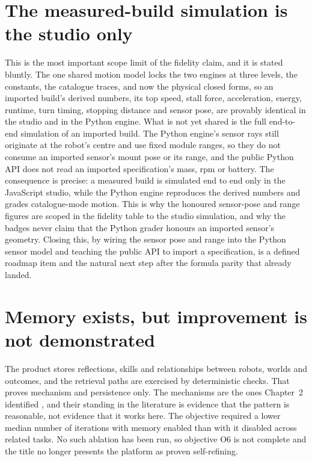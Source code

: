 \documentclass[11pt,a4paper]{report}
\begin{document}
\section{The measured-build simulation is the studio only}
This is the most important scope limit of the fidelity claim, and it is stated bluntly. The one shared motion model locks the two engines at three levels, the constants, the catalogue traces, and now the physical closed forms, so an imported build's derived numbers, its top speed, stall force, acceleration, energy, runtime, turn timing, stopping distance and sensor pose, are provably identical in the studio and in the Python engine. What is not yet shared is the full end-to-end simulation of an imported build. The Python engine's sensor rays still originate at the robot's centre and use fixed module ranges, so they do not consume an imported sensor's mount pose or its range, and the public Python API does not read an imported specification's mass, rpm or battery. The consequence is precise: a measured build is simulated end to end only in the JavaScript studio, while the Python engine reproduces the derived numbers and grades catalogue-mode motion. This is why the honoured sensor-pose and range figures are scoped in the fidelity table to the studio simulation, and why the badges never claim that the Python grader honours an imported sensor's geometry. Closing this, by wiring the sensor pose and range into the Python sensor model and teaching the public API to import a specification, is a defined roadmap item and the natural next step after the formula parity that already landed.

\section{Memory exists, but improvement is not demonstrated}
\label{sec:memory-limit}
The product stores reflections, skills and relationships between robots, worlds and outcomes, and the retrieval paths are exercised by deterministic checks. That proves mechanism and persistence only. The mechanisms are the ones Chapter~2 identified \citep{shinn2023,wang2023,wu2025}, and their standing in the literature is evidence that the pattern is reasonable, not evidence that it works here. The objective required a lower median number of iterations with memory enabled than with it disabled across related tasks. No such ablation has been run, so objective O6 is not complete and the title no longer presents the platform as proven self-refining.
\end{document}
